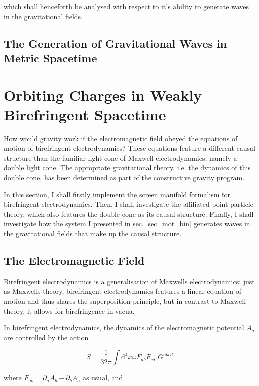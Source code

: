 \documentclass[11pt]{article}
\begin{document}
which shall henceforth be analysed with respect to it's ability to generate waves in the gravitational fields.


\subsection{The Generation of Gravitational Waves in Metric Spacetime}



\section{Orbiting Charges in Weakly Birefringent Spacetime}

How would gravity work if the electromagnetic field obeyed the equations of motion of birefringent electrodynamics? These equations feature a different causal structure than the familiar light cone of Maxwell electrodynamics, namely a double light cone. The appropriate gravitational theory, i.e. the  dynamics of this double cone, has been determined as part of the constructive gravity program.

In this section, I shall firstly implement the screen manifold formalism for birefringent electrodynamics. Then, I shall investigate the affiliated point particle theory, which also features the double cone as its causal structure. Finally, I shall investigate how the system I presented in sec. \ref{sec_mot_bin} generates waves in the gravitational fields that make up the causal structure.

\subsection{The Electromagnetic Field} \label{sec_em_am}

Birefringent electrodynamics is a generalisation of Maxwells electrodynamics: just as Maxwells theory, birefringent electrodynamics features a linear equation of motion and thus shares the superposition principle, but in contrast to Maxwell theory, it allows for birefringence in vacua.

In birefringent electrodynamics, the dynamics of the electromagnetic potential $A_a$ are controlled by the action 

\begin{equation} \label{act_gled}
	S = \frac{1}{32 \pi} \int \mathrm{d}^4 x \omega F_{a b} F_{c d} \, \,
	G^{a b c d}
\end{equation}

where $F_{a b} = \partial_a A_b - \partial_b A_a $ as usual, and 
\end{document}
